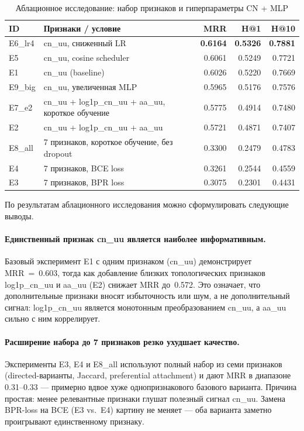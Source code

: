 \documentclass[a4paper,12pt]{extarticle}
\begin{document}
\begin{table}[ht]
	\caption{Аблационное исследование: набор признаков и гиперпараметры CN + MLP}
	\label{table:ablation_cnmlp}
	\footnotesize
	\centering
	\begin{tabular}{llrrr}
		\toprule
		ID & Признаки / условие & MRR & H@1 & H@10 \\
		\midrule
		E6\_lr4 & cn\_uu, сниженный LR                      & \textbf{0.6164} & \textbf{0.5326} & \textbf{0.7881} \\
		E5      & cn\_uu, cosine scheduler                  & 0.6061 & 0.5249 & 0.7721 \\
		E1      & cn\_uu (baseline)                         & 0.6026 & 0.5220 & 0.7669 \\
		E9\_big & cn\_uu, увеличенная MLP                   & 0.5965 & 0.5176 & 0.7576 \\
		E7\_e2  & cn\_uu + log1p\_cn\_uu + aa\_uu, короткое обучение & 0.5775 & 0.4914 & 0.7480 \\
		E2      & cn\_uu + log1p\_cn\_uu + aa\_uu           & 0.5721 & 0.4871 & 0.7407 \\
		E8\_all & 7 признаков, короткое обучение, без dropout & 0.3300 & 0.2479 & 0.4783 \\
		E4      & 7 признаков, BCE loss                     & 0.3261 & 0.2544 & 0.4559 \\
		E3      & 7 признаков, BPR loss                     & 0.3075 & 0.2301 & 0.4431 \\
		\bottomrule
	\end{tabular}
\end{table}

По результатам аблационного исследования можно сформулировать следующие выводы.

\paragraph{Единственный признак cn\_uu является наиболее информативным.}
Базовый эксперимент E1 с одним признаком (cn\_uu) демонстрирует MRR~=~0.603, тогда как добавление близких топологических признаков log1p\_cn\_uu и aa\_uu (E2) снижает MRR до~0.572. Это означает, что дополнительные признаки вносят избыточность или шум, а не дополнительный сигнал: log1p\_cn\_uu является монотонным преобразованием cn\_uu, а aa\_uu сильно с ним коррелирует.

\paragraph{Расширение набора до 7 признаков резко ухудшает качество.}
Эксперименты E3, E4 и E8\_all используют полный набор из семи признаков (directed-варианты, Jaccard, preferential attachment) и дают MRR в диапазоне 0.31--0.33 --- примерно вдвое хуже однопризнакового базового варианта. Причина простая: менее релевантные признаки глушат полезный сигнал cn\_uu. Замена BPR-loss на BCE (E3 vs.\ E4) картину не меняет --- оба варианта заметно проигрывают единственному признаку.
\end{document}

